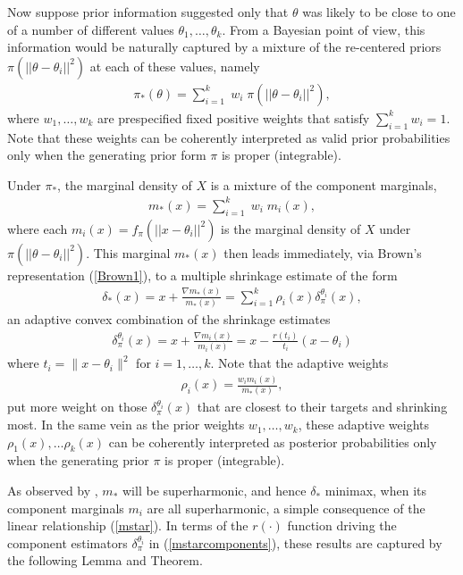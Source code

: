 \documentclass[11pt]{article}
\theoremstyle{definition}
\begin{document}
Now suppose prior information suggested only that $\theta$ was likely to be close to one of a number of different values $\theta_1,\ldots,\theta_k$.  From a Bayesian point of view, this information would be naturally captured by a mixture of the re-centered priors $\pi(||\theta - \theta_i||^2)$ at each of these values, namely
\begin{align}\label{mixtureprior}
    \pi_{*}(\theta) = \sum\limits_{i=1}^{k}\;w_i\;\pi(||\theta - \theta_i||^2),
\end{align}
where $w_1, \ldots,w_k$ are prespecified fixed positive weights that satisfy $\sum_{i = 1}^k w_i = 1$.
Note that these weights can be coherently interpreted as valid prior probabilities only when the generating prior form $\pi$ is proper (integrable).  

Under $\pi_{*}$, the marginal density of $X$ is a mixture of the component marginals,
\begin{align} \label{mstar}
m_*(x) = \sum\limits_{i=1}^{k}\;w_i\;m_i(x),
\end{align}
where each $m_i(x) = f_{\pi}(||x - \theta_i||^2)$ is the marginal density of $X$ under $\pi(||\theta - \theta_i||^2)$.
This marginal $m_*(x)$ then leads immediately, via Brown's representation (\ref{Brown1}), to a multiple shrinkage estimate of the form
\begin{align}
\delta_{*}(x) = x + \frac{\nabla m_*(x)}{m_*(x)} = \sum_{i=1}^k \rho_i(x) \delta_\pi^{\theta_i} (x),
\label{MultipleShrinkageEstimator}
\end{align}
an adaptive convex combination of the  shrinkage estimates
\begin{align}\label{mstarcomponents}
\delta_\pi^{\theta_i}(x) = x + \frac{\nabla m_i(x)}{m_i(x)} =  x - \frac{ r(t_i)}{t_i}(x-\theta_i)
\end{align}
where $ t_i = \|x-\theta_i\|^2$ for $ i = 1,\ldots,k$.  Note that the adaptive weights 
\begin{align}
\rho_i(x)  = \frac{w_i m_i (x)}{ m_*(x)},
\end{align}
put more weight on those $\delta_\pi^{\theta_i}(x)$ that are closest to their targets and shrinking most.
In the same vein as the prior weights $w_1, \ldots,w_k$, these adaptive weights $\rho_1(x),\ldots \rho_k(x)$ can be coherently interpreted as posterior probabilities only when the generating prior $\pi$ is proper (integrable).

As observed by \cite{george1986a},  $m_*$ will be superharmonic, and hence $\delta_{*}$ minimax, when its component marginals $m_i$ are all superharmonic, a simple consequence of the linear relationship (\ref{mstar}).  In terms of the $r(\cdot)$ function driving the component estimators $\delta_\pi^{\theta_i}$ in (\ref{mstarcomponents}), these results are captured by the following Lemma and Theorem.  
\end{document}
